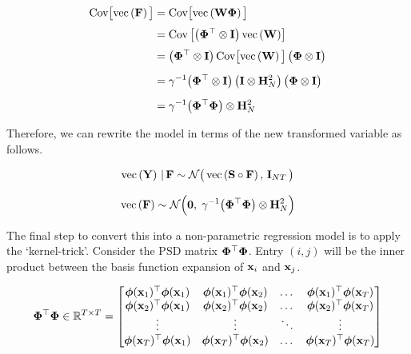 \begin{align*}
    \text{Cov}\big[\text{\textup{vec}}\left(\mathbf{F}\right)\big] &= \text{Cov}\big[\text{\textup{vec}}\left(\mathbf{W} \mathbf{\Phi}\right)\big] \\[0.1cm]
    &= \text{Cov}\left[\big(\mathbf{\Phi}^\top \otimes \mathbf{I}\big) \, \text{\textup{vec}}\left(\mathbf{W}\right)\right] \\[0.1cm]
    &= \big(\mathbf{\Phi}^\top \otimes \mathbf{I}\big) \, \text{Cov}\big[\text{\textup{vec}}\left(\mathbf{W}\right)\big] \, \big(\mathbf{\Phi} \otimes \mathbf{I}\big) \\[0.2cm]
    &= \gamma^{-1}  \big(\mathbf{\Phi}^\top \otimes \mathbf{I}\big) \, \big(\mathbf{I} \otimes \mathbf{H}_N^{2} \big) \, \big(\mathbf{\Phi} \otimes \mathbf{I}\big) \\[0.2cm]
    &= \gamma^{-1} \big( \mathbf{\Phi}^\top \mathbf{\Phi} \big) \otimes \mathbf{H}_N^2
\end{align*}

Therefore, we can rewrite the model in terms of the new transformed variable as follows. 

\begin{equation}
    \text{\textup{vec}}\left(\mathbf{Y}\right) \, | \, \mathbf{F} \sim \mathcal{N}\big(\, \text{\textup{vec}}\left(\mathbf{S} \circ \mathbf{F}\right), \, \mathbf{I}_{NT} \, \big)
\end{equation}

\begin{equation}
    \label{eq:F_prior2}
    \text{\textup{vec}}\left(\mathbf{F}\right) \sim \mathcal{N}\Big(\mathbf{0}, \; \gamma^{-1} \big(\mathbf{\Phi}^\top \mathbf{\Phi} \big) \otimes \mathbf{H}_N^{2}\Big)
\end{equation}


The final step to convert this into a non-parametric regression model is to apply the `kernel-trick'. Consider the PSD matrix $\mathbf{\Phi}^\top \mathbf{\Phi}$. Entry $(i, j)$ will be the inner product between the basis function expansion of $\mathbf{x}_i$ and $\mathbf{x}_j$. 

\begin{equation}
    \mathbf{\Phi}^\top \mathbf{\Phi} \in \mathbb{R}^{T \times T} = 
    \begin{bmatrix} 
        \boldsymbol{\phi}(\mathbf{x}_1)^\top\boldsymbol{\phi}(\mathbf{x}_1) & \boldsymbol{\phi}(\mathbf{x}_1)^\top\boldsymbol{\phi}(\mathbf{x}_2) & \dots & \boldsymbol{\phi}(\mathbf{x}_1)^\top\boldsymbol{\phi}(\mathbf{x}_T) \\
        \boldsymbol{\phi}(\mathbf{x}_2)^\top\boldsymbol{\phi}(\mathbf{x}_1) & \boldsymbol{\phi}(\mathbf{x}_2)^\top\boldsymbol{\phi}(\mathbf{x}_2) & \dots & \boldsymbol{\phi}(\mathbf{x}_2)^\top\boldsymbol{\phi}(\mathbf{x}_T) \\
        \vdots & \vdots & \ddots & \vdots  \\
        \boldsymbol{\phi}(\mathbf{x}_T)^\top\boldsymbol{\phi}(\mathbf{x}_1) & \boldsymbol{\phi}(\mathbf{x}_T)^\top\boldsymbol{\phi}(\mathbf{x}_2) & \dots & \boldsymbol{\phi}(\mathbf{x}_T)^\top\boldsymbol{\phi}(\mathbf{x}_T) \\
    \end{bmatrix}
\end{equation}

